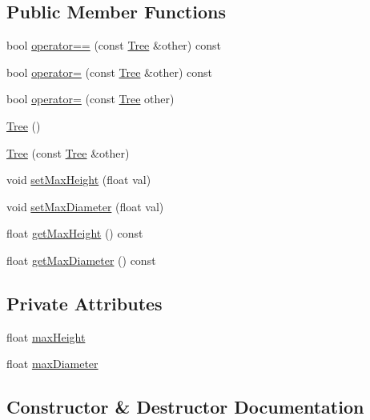 \subsection*{Public Member Functions}
\begin{DoxyCompactItemize}
\item 
bool \mbox{\hyperlink{class_tree_a9672b806456d9c1fc6a9ffa0a0803071}{operator==}} (const \mbox{\hyperlink{class_tree}{Tree}} \&other) const
\item 
bool \mbox{\hyperlink{class_tree_a9d2ba086c896bd54a3d789da5d0ae7dc}{operator=}} (const \mbox{\hyperlink{class_tree}{Tree}} \&other) const
\item 
bool \mbox{\hyperlink{class_tree_af56ab40d0b2a675c75e3ad10de48ada2}{operator=}} (const \mbox{\hyperlink{class_tree}{Tree}} other)
\item 
\mbox{\hyperlink{class_tree_ad376a7c639d857312f5de2ef47482f68}{Tree}} ()
\item 
\mbox{\hyperlink{class_tree_af785767b64df102fdfe700b745d8bb46}{Tree}} (const \mbox{\hyperlink{class_tree}{Tree}} \&other)
\item 
void \mbox{\hyperlink{class_tree_afb29372db5251e9355aedd129e5d9a49}{set\+Max\+Height}} (float val)
\item 
void \mbox{\hyperlink{class_tree_a4073a7cc0b9b3388db7bff4491e96e72}{set\+Max\+Diameter}} (float val)
\item 
float \mbox{\hyperlink{class_tree_a9d8cea49effa2ceb8f4096992ae20fd9}{get\+Max\+Height}} () const
\item 
float \mbox{\hyperlink{class_tree_a38cd2e7ee4d3a5a0f98a65131fc8c444}{get\+Max\+Diameter}} () const
\end{DoxyCompactItemize}
\subsection*{Private Attributes}
\begin{DoxyCompactItemize}
\item 
float \mbox{\hyperlink{class_tree_a5bcc9823dd464d77520fbafdc1c8eb44}{max\+Height}}
\item 
float \mbox{\hyperlink{class_tree_a078ecd006ec479cde84bf9e4f96219a8}{max\+Diameter}}
\end{DoxyCompactItemize}


\subsection{Constructor \& Destructor Documentation}
\mbox{\label{class_tree_ad376a7c639d857312f5de2ef47482f68}} 
